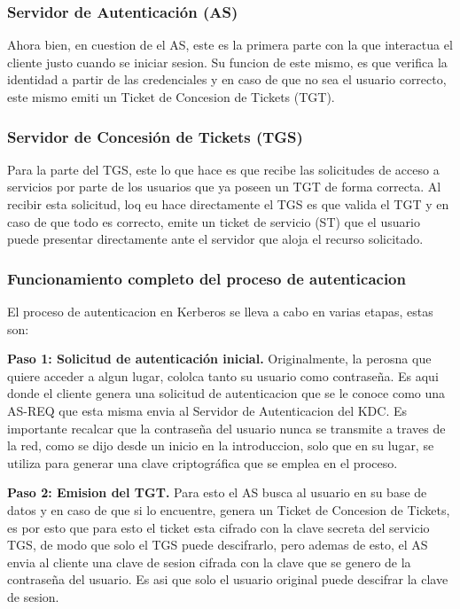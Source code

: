 \documentclass[letterpaper,12pt]{article}
\begin{document}
\subsubsection{Servidor de Autenticaci\'on (AS)}

Ahora bien, en cuestion de el AS, este es la primera parte
con la que interactua el cliente justo cuando se iniciar sesion. 
Su funcion de este mismo, es que verifica la identidad a partir de las credenciales y
en caso de que no sea el usuario correcto, este mismo emiti un Ticket de Concesion de Tickets (TGT).

\subsubsection{Servidor de Concesi\'on de Tickets (TGS)}

Para la parte del TGS, este lo que hace es que recibe las solicitudes de acceso a 
servicios por parte de los usuarios que ya poseen un TGT de forma correcta. 
Al recibir esta solicitud, loq eu hace directamente el TGS es que valida el TGT y en caso de que todo es correcto, 
emite un ticket de servicio (ST) que el usuario puede presentar directamente ante el servidor que aloja el recurso solicitado. 
\subsubsection{Funcionamiento completo del proceso de autenticacion}

El proceso de autenticacion en Kerberos se lleva a cabo en varias etapas, estas son:

\textbf{Paso 1: Solicitud de autenticaci\'on inicial.} Originalmente, la perosna que quiere acceder a algun lugar, cololca tanto su usuario como contraseña.
Es aqui donde el cliente genera una solicitud de autenticacion que se le conoce como una AS-REQ que esta misma envia 
al Servidor de Autenticacion del KDC. Es importante recalcar que la contraseña 
del usuario nunca se transmite a traves de la red, como se dijo desde un inicio en la introduccion, solo que en su lugar, 
se utiliza para generar una clave criptogr\'afica que se emplea en el proceso.

\textbf{Paso 2: Emision del TGT.} Para esto el AS busca al usuario en su base de datos y en caso de que si lo encuentre,
genera un Ticket de Concesion de Tickets, es por esto que para esto el ticket esta cifrado con la clave secreta del 
servicio TGS, de modo que solo el TGS puede descifrarlo, pero ademas de esto, el AS envia al cliente 
una clave de sesion cifrada con la clave que se genero de la contraseña del usuario. 
Es asi que solo el usuario original puede descifrar la clave de sesion.
\end{document}
